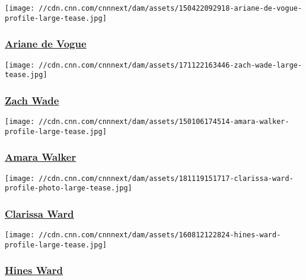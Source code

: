 \href{/profiles/ariane-de-vogue-profile}{}

\texttt{[image: //cdn.cnn.com/cnnnext/dam/assets/150422092918-ariane-de-vogue-profile-large-tease.jpg]}

\hypertarget{ariane-de-vogue}{%
\subsubsection{\texorpdfstring{\href{/profiles/ariane-de-vogue-profile}{Ariane
de Vogue}}{Ariane de Vogue}}\label{ariane-de-vogue}}

\href{/profiles/zach-wade}{}

\texttt{[image: //cdn.cnn.com/cnnnext/dam/assets/171122163446-zach-wade-large-tease.jpg]}

\hypertarget{zach-wade}{%
\subsubsection{\texorpdfstring{\href{/profiles/zach-wade}{Zach
Wade}}{Zach Wade}}\label{zach-wade}}

\href{/profiles/amara-walker}{}

\texttt{[image: //cdn.cnn.com/cnnnext/dam/assets/150106174514-amara-walker-profile-large-tease.jpg]}

\hypertarget{amara-walker}{%
\subsubsection{\texorpdfstring{\href{/profiles/amara-walker}{Amara
Walker}}{Amara Walker}}\label{amara-walker}}

\href{/profiles/clarissa-ward-profile}{}

\texttt{[image: //cdn.cnn.com/cnnnext/dam/assets/181119151717-clarissa-ward-profile-photo-large-tease.jpg]}

\hypertarget{clarissa-ward}{%
\subsubsection{\texorpdfstring{\href{/profiles/clarissa-ward-profile}{Clarissa
Ward}}{Clarissa Ward}}\label{clarissa-ward}}

\href{/profiles/hines-ward-profile}{}

\texttt{[image: //cdn.cnn.com/cnnnext/dam/assets/160812122824-hines-ward-profile-large-tease.jpg]}

\hypertarget{hines-ward}{%
\subsubsection{\texorpdfstring{\href{/profiles/hines-ward-profile}{Hines
Ward}}{Hines Ward}}\label{hines-ward}}

